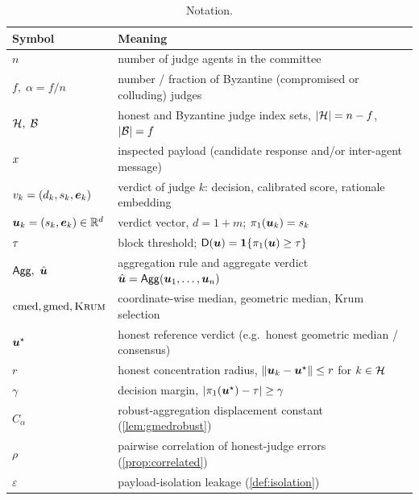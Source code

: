 \begin{table}[t]
\centering
\caption{Notation.}
\label{tab:notation}
\small
\begin{tabular}{@{}ll@{}}
\toprule
Symbol & Meaning \\
\midrule
$n$ & number of judge agents in the committee \\
$f,\;\alpha=f/n$ & number / fraction of Byzantine (compromised or colluding) judges \\
$\mathcal{H},\;\mathcal{B}$ & honest and Byzantine judge index sets, $|\mathcal{H}|=n-f$, $|\mathcal{B}|=f$ \\
$x$ & inspected payload (candidate response and/or inter-agent message) \\
$v_k=(d_k,s_k,\bm{e}_k)$ & verdict of judge $k$: decision, calibrated score, rationale embedding \\
$\bm{u}_k=(s_k,\bm{e}_k)\in\mathbb{R}^d$ & verdict vector, $d=1+m$; $\pi_1(\bm{u}_k)=s_k$ \\
$\tau$ & block threshold; $\mathsf{D}(\bm{u})=\mathbf 1\{\pi_1(\bm{u})\ge\tau\}$ \\
$\Agg,\ \uhat$ & aggregation rule and aggregate verdict $\hat{\bm{u}}=\mathsf{Agg}(\bm{u}_1,\dots,\bm{u}_n)$ \\
$\operatorname{cmed},\operatorname{gmed},\textsc{Krum}$ & coordinate-wise median, geometric median, Krum selection \\
$\bm{u}^{\star}$ & honest reference verdict (e.g.\ honest geometric median / consensus) \\
$r$ & honest concentration radius, $\lVert\bm{u}_k-\bm{u}^{\star}\rVert\le r$ for $k\in\mathcal{H}$ \\
$\gamma$ & decision margin, $|\pi_1(\bm{u}^{\star})-\tau|\ge\gamma$ \\
$C_\alpha$ & robust-aggregation displacement constant (\cref{lem:gmedrobust}) \\
$\rho$ & pairwise correlation of honest-judge errors (\cref{prop:correlated}) \\
$\varepsilon$ & payload-isolation leakage (\cref{def:isolation}) \\
\bottomrule
\end{tabular}
\end{table}
